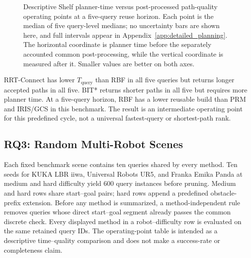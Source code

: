 \documentclass[journal]{IEEEtran}
\newcommand{\rbf}{RBF}
\newcommand{\Tbuild}{\ensuremath{T_{\mathrm{build}}}}
\newcommand{\Tquery}{\ensuremath{T_{\mathrm{query}}}}
\begin{document}
\begin{figure}[!t]
\centering
{}
\caption{Descriptive Shelf planner-time versus post-processed path-quality
operating points at a five-query reuse horizon. Each point is the median of five query-level medians; no uncertainty bars are shown here, and full intervals appear in
Appendix~\ref{app:detailed_planning}. The horizontal coordinate is planner time
before the separately accounted common post-processing, while the vertical
coordinate is measured after it. Smaller values are better on both axes.}
\label{fig:tro_shelf_cross_tradeoff}
\end{figure}

RRT-Connect has lower $\Tquery$ than \rbf{} in all five queries but
returns longer accepted paths in all five. BIT* returns shorter
paths in all five but requires more planner time. At a five-query horizon,
\rbf{} has a lower reusable build than PRM and IRIS/GCS in this benchmark.
The result is an intermediate operating point for this predefined cycle, not a
universal fastest-query or shortest-path rank.

\subsection{RQ3: Random Multi-Robot Scenes}\label{sec:exp_generalization}

Each fixed benchmark scene contains ten queries shared by every method. Ten seeds
for KUKA LBR iiwa, Universal Robots UR5, and Franka Emika Panda at medium and
hard difficulty yield 600 query instances before pruning. Medium and hard rows
share start--goal pairs; hard rows append a predefined obstacle-prefix
extension. Before any method is summarized, a method-independent rule removes
queries whose direct start--goal segment already passes the common discrete
check. Every displayed method in a robot--difficulty row is evaluated on the
same retained query IDs. The operating-point table is intended as a descriptive
time--quality comparison and does not make a success-rate or completeness claim.
\end{document}
